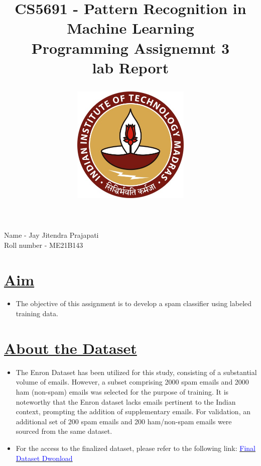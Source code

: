 \documentclass[12pt, a4paper]{article}
\title{\textbf{\huge CS5691 - Pattern Recognition in Machine Learning}\\ 
\vspace{5mm}
\huge Programming Assignemnt 3\\
\vspace{5mm}
lab Report\\
\vspace{20mm}
\begin{figure}[h]
    \centering
    \includegraphics[width=0.5\textwidth]{IIT_Madras_Logo}
\end{figure}
}
\author{}
\date{}
\newcommand{\ulsection}[1]{\texorpdfstring{\uline{#1}}{#1}}
\begin{document}
\maketitle %
\vfill
\begin{center}
    \huge Name - Jay Jitendra Prajapati\\
    \vspace{5mm}
    Roll number - ME21B143
\end{center}
\newpage %
\renewcommand{\cftsecfont}{\bfseries\large} %
\renewcommand{\cftsubsecfont}{\large} %
\renewcommand{\cftsecpagefont}{\bfseries\large} %
\renewcommand{\cftsubsecpagefont}{\large} %
\renewcommand{\cftsecdotsep}{\cftdotsep} %
\setlength{\cftbeforesecskip}{10pt} %
\setlength{\cftbeforesubsecskip}{8pt} %
\setlength{\cftsecindent}{0pt} %
\setlength{\cftsubsecindent}{20pt} %
\tableofcontents
\newpage
\section{\ulsection{Aim}}
\begin{itemize}
    \item \large The objective of this assignment is to develop a spam classifier using labeled training data.
\end{itemize}
\section{\ulsection{About the Dataset}}
\begin{itemize}
    \item \large The Enron Dataset has been utilized for this study, consisting of a substantial volume of emails. However, a subset comprising 2000 spam emails and 2000 ham (non-spam) emails was selected for the purpose of training. It is noteworthy that the Enron dataset lacks emails pertinent to the Indian context, prompting the addition of supplementary emails. For validation, an additional set of 200 spam emails and 200 ham/non-spam emails were sourced from the same dataset.
    \item For the access to the finalized dataset, please refer to the following link: \href{https://drive.google.com/file/d/1gFdN-k4Zq8uwX22M04oO_HINlzmC1L2E/view?usp=sharing}{\textcolor{blue}{Final Dataset Dwonload}} 
\end{itemize}
\end{document}
